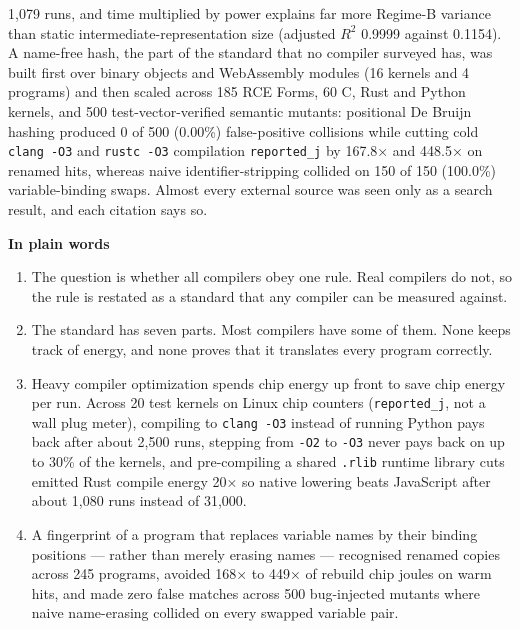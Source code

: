 \documentclass[10pt,letterpaper]{article}
\newcounter{none}
\providecommand{\tightlist}{\setlength{\itemsep}{1pt}\setlength{\parskip}{0pt}}
\begin{document}
1,079 runs, and time multiplied by power explains far more Regime-B
variance than static intermediate-representation size (adjusted \(R^2\)
0.9999 against 0.1154). A name-free hash, the part of the standard that
no compiler surveyed has, was built first over binary objects and
WebAssembly modules (16 kernels and 4 programs) and then scaled across
185 RCE Forms, 60 C, Rust and Python kernels, and 500
test-vector-verified semantic mutants: positional De Bruijn hashing
produced 0 of 500 (0.00\%) false-positive collisions while cutting cold
\texttt{clang\ -\allowbreak{}O3} and \texttt{rustc\ -\allowbreak{}O3} compilation
\texttt{reported\_\allowbreak{}j} by 167.8× and 448.5× on renamed hits, whereas naive
identifier-stripping collided on 150 of 150 (100.0\%) variable-binding
swaps. Almost every external source was seen only as a search result,
and each citation says so.

\textbf{In plain words}

\begin{enumerate}
\def\labelenumi{\arabic{enumi}.}
\tightlist
\item
  The question is whether all compilers obey one rule. Real compilers do
  not, so the rule is restated as a standard that any compiler can be
  measured against.
\item
  The standard has seven parts. Most compilers have some of them. None
  keeps track of energy, and none proves that it translates every
  program correctly.
\item
  Heavy compiler optimization spends chip energy up front to save chip
  energy per run. Across 20 test kernels on Linux chip counters
  (\texttt{reported\_\allowbreak{}j}, not a wall plug meter), compiling to
  \texttt{clang\ -\allowbreak{}O3} instead of running Python pays back after about
  2,500 runs, stepping from \texttt{-O2} to \texttt{-O3} never pays back
  on up to 30\% of the kernels, and pre-compiling a shared
  \texttt{.rlib} runtime library cuts emitted Rust compile energy 20× so
  native lowering beats JavaScript after about 1,080 runs instead of
  31,000.
\item
  A fingerprint of a program that replaces variable names by their
  binding positions --- rather than merely erasing names --- recognised
  renamed copies across 245 programs, avoided 168× to 449× of rebuild
  chip joules on warm hits, and made zero false matches across 500
  bug-injected mutants where naive name-erasing collided on every
  swapped variable pair.
\end{enumerate}
\end{document}
